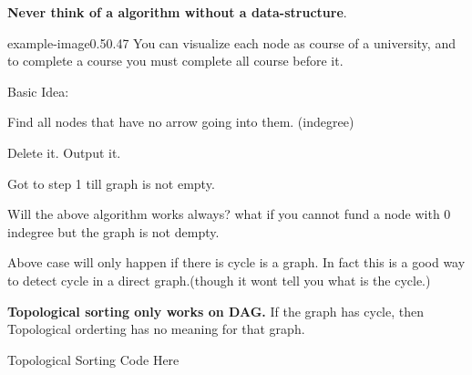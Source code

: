 \begin{marginfigure}
    \vspace{2mm}
    
    \raggedright
    \textbf{
        Never think of a algorithm without a data-structure}.
\end{marginfigure}

\vspace{5cm}
\begin{lfigure}{example-image}{0.5}{0.47}
    You can visualize each node as course of a university, and to complete a course you must complete all course before it.

    Basic Idea:
    \begin{compactenum}
        \item Find all nodes that have no arrow going into them. (indegree)
        \item Delete it. Output it.
        \item Got to step 1 till graph is not empty.
    \end{compactenum}
\end{lfigure}

Will the above algorithm works always? what if you cannot fund a node with 0 indegree but the graph is not dempty.

Above case will only happen if there is cycle is a graph. In fact this is a good way to detect cycle in a direct graph.(though it wont tell you what is the cycle.)

\textbf{Topological sorting only works on DAG.} If the graph has cycle, then Topological orderting has no meaning for that graph.

\medskip
\begin{code3}
    Topological Sorting Code Here
\end{code3}



